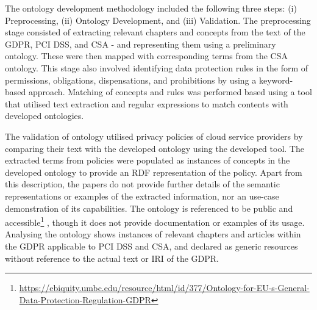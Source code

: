 The ontology development methodology included the following three steps: (i) Preprocessing, (ii) Ontology Development, and (iii) Validation. The preprocessing stage consisted of extracting relevant chapters and concepts from the text of the GDPR, PCI DSS, and CSA - and representing them using a preliminary ontology. These were then mapped with corresponding terms from the CSA ontology. This stage also involved identifying data protection rules in the form of permissions, obligations, dispensations, and prohibitions by using a keyword-based approach. Matching of concepts and rules was performed based using a tool that utilised text extraction and regular expressions to match contents with developed ontologies.

The validation of ontology utilised privacy policies of cloud service providers by comparing their text with the developed ontology using the developed tool. The extracted terms from policies were populated as instances of concepts in the developed ontology to provide an RDF representation of the policy. Apart from this description, the papers do not provide further details of the semantic representations or examples of the extracted information, nor an use-case demonstration of its capabilities. The ontology is referenced to be public and accessible\footnote{\url{https://ebiquity.umbc.edu/resource/html/id/377/Ontology-for-EU-s-General-Data-Protection-Regulation-GDPR}} \cite{elluri_knowledge_2018}, though it does not provide documentation or examples of its usage. Analysing the ontology shows instances of relevant chapters and articles within the GDPR applicable to PCI DSS and CSA, and declared as generic resources without reference to the actual text or IRI of the GDPR.

